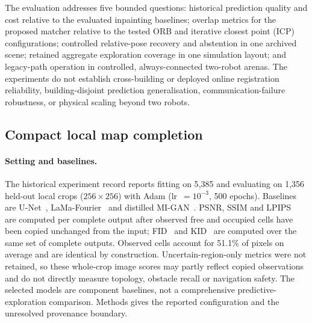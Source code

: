 \documentclass[11pt]{article}
\begin{document}

The evaluation addresses five bounded questions: historical prediction quality and cost relative to the evaluated inpainting baselines; overlap metrics for the proposed matcher relative to the tested ORB and iterative closest point (ICP) configurations; controlled relative-pose recovery and abstention in one archived scene; retained aggregate exploration coverage in one simulation layout; and legacy-path operation in controlled, always-connected two-robot arenas. The experiments do not establish cross-building or deployed online registration reliability, building-disjoint prediction generalisation, communication-failure robustness, or physical scaling beyond two robots.

\subsection{Compact local map completion} \label{sec:local-map-prediction}

\paragraph{Setting and baselines.}
The historical experiment record reports fitting on 5{,}385 and evaluating on 1{,}356 held-out local crops ($256\times256$) with Adam (lr~$=10^{-3}$, 500 epochs). Baselines are U-Net~\citep{ronneberger2015u}, LaMa-Fourier~\citep{suvorov2021resolution} and distilled MI-GAN~\citep{sargsyan2023mi}. PSNR, SSIM and LPIPS~\citep{zhang2018perceptual} are computed per complete output after observed free and occupied cells have been copied unchanged from the input; FID~\citep{heusel2017gans,obukhov2020torchfidelity} and KID~\citep{obukhov2020torchfidelity,binkowski2018demystifying} are computed over the same set of complete outputs. Observed cells account for 51.1\% of pixels on average and are identical by construction. Uncertain-region-only metrics were not retained, so these whole-crop image scores may partly reflect copied observations and do not directly measure topology, obstacle recall or navigation safety. The selected models are component baselines, not a comprehensive predictive-exploration comparison. Methods gives the reported configuration and the unresolved provenance boundary.
\end{document}
